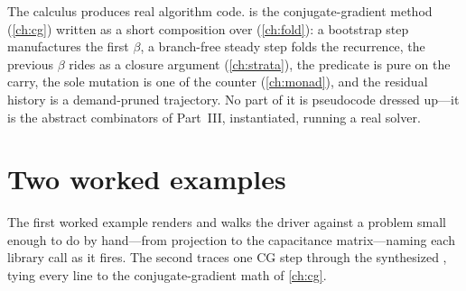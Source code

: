 \begin{keyidea}
The calculus produces real algorithm code.  is the conjugate-gradient
method (\cref{ch:cg}) written as a short composition over
 (\cref{ch:fold}): a bootstrap step manufactures the
first $\beta$, a branch-free steady step folds the recurrence, the previous $\beta$
rides as a closure argument (\cref{ch:strata}), the predicate is pure on the carry,
the sole mutation is one  of the counter (\cref{ch:monad}), and the
residual history is a demand-pruned trajectory. No part of it is pseudocode dressed
up---it is the abstract combinators of Part~III, instantiated, running a real solver.
\end{keyidea}

\section{Two worked examples}
\label{sec:worked}

The first worked example renders and walks the  driver against a
problem small enough to do by hand---from  projection to the capacitance
matrix---naming each library call as it fires. The second traces one CG step through
the synthesized , tying every line to the conjugate-gradient
math of \cref{ch:cg}.

